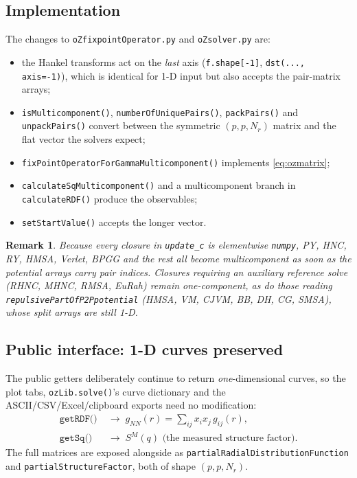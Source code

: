 \documentclass[11pt,a4paper]{article}
\newtheorem{remark}{Remark}
\newcommand{\code}[1]{\texttt{#1}}
\begin{document}
\subsection{Implementation}

The changes to \code{oZfixpointOperator.py} and \code{oZsolver.py} are:

\begin{itemize}[nosep]
\item the Hankel transforms act on the \emph{last} axis (\code{f.shape[-1]},
      \code{dst(...,\,axis=-1)}), which is identical for 1-D input but also
      accepts the pair-matrix arrays;
\item \code{isMulticomponent()}, \code{numberOfUniquePairs()},
      \code{packPairs()} and \code{unpackPairs()} convert between the
      symmetric $(p,p,N_r)$ matrix and the flat vector the solvers expect;
\item \code{fixPointOperatorForGammaMulticomponent()} implements
      \eqref{eq:ozmatrix};
\item \code{calculateSqMulticomponent()} and a multicomponent branch in
      \code{calculateRDF()} produce the observables;
\item \code{setStartValue()} accepts the longer vector.
\end{itemize}

\begin{remark}
Because every closure in \code{update\_c} is elementwise \code{numpy}, PY,
HNC, RY, HMSA, Verlet, BPGG and the rest all become multicomponent as soon as
the potential arrays carry pair indices. Closures requiring an auxiliary
reference solve (RHNC, MHNC, RMSA, EuRah) remain one-component, as do those
reading \code{repulsivePartOfP2Ppotential} (HMSA, VM, CJVM, BB, DH, CG,
SMSA), whose split arrays are still 1-D.
\end{remark}

\subsection{Public interface: 1-D curves preserved}

The public getters deliberately continue to return \emph{one}-dimensional
curves, so the plot tabs, \code{ozLib.solve()}'s curve dictionary and the
ASCII/CSV/Excel/clipboard exports need no modification:
\begin{align}
\code{getRDF()} &\;\rightarrow\; g_{NN}(r)=\sum_{ij}x_ix_j\,g_{ij}(r),\\
\code{getSq()}  &\;\rightarrow\; S^{M}(q) \text{ (the measured structure factor)}.
\end{align}
The full matrices are exposed alongside as
\code{partialRadialDistributionFunction} and
\code{partialStructureFactor}, both of shape $(p,p,N_r)$.
\end{document}
